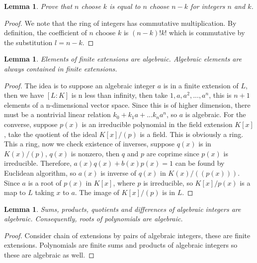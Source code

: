 \documentclass[10pt,twocolumn]{article}
\newtheorem{lemma}[theorem]{Lemma}
\begin{document}
\begin{lemma}
Prove that $n$ choose $k$ is equal to $n$ choose $n - k$ for integers $n$ and $k$.
\end{lemma}

\begin{proof}
    We note that the ring of integers has commutative multiplication. By definition, the coefficient of $n$ choose $k$ is $(n - k)! k!$ which is commutative by the substitution $l = n - k$.
\end{proof}


\begin{lemma}
    Elements of finite extensions are algebraic. Algebraic elements are always contained in finite extensions.
\end{lemma}

\begin{proof}
The idea is to suppose an algebraic integer $a$ is in a finite extension of $L$, then we have $[L:K]$ is n less than infinity, then take $1, a, a^2, ..., a^n$, this is $n + 1$ elements of a n-dimensional vector space. Since this is of higher dimension, there must be a nontrivial linear relation $k_0 + k_1 a + ... k_n a^n$, so $a$ is algebraic. For the converse, suppose $p(x)$ is an irreducible polynomial in the field extension $K[x]$, take the quotient of the ideal $K[x]/(p)$ is a field. This is obviously a ring. This a ring, now we check existence of inverses, suppose $q(x)$ is in $K(x)/(p)$, $q(x)$ is nonzero, then $q$ and $p$ are coprime since $p(x)$ is irreducible. Therefore, $a(x)q(x) + b(x) p(x) = 1$ can be found by Euclidean algorithm, so $a(x)$ is inverse of $q(x)$ in $K(x)/((p(x)))$. Since $a$ is a root of $p(x)$ in $K[x]$, where $p$ is irreducible, so $K[x]/p(x)$ is a map to $L$ taking $x$ to $a$. The image of $K[x]/(p)$ is in $L$.
\end{proof}

\begin{lemma}
    Sums, products, quotients and differences of algebraic integers are algebraic. Consequently, roots of polynomials are algebraic.
\end{lemma}

\begin{proof}
    Consider chain of extensions by pairs of algebraic integers, these are finite extensions. Polynomials are finite sums and products of algebraic integers so these are algebraic as well.
\end{proof}


\end{document}
